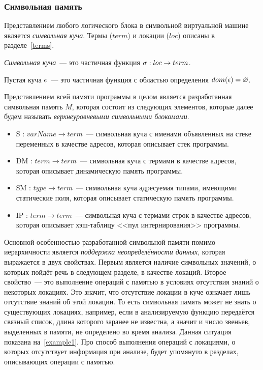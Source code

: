 \subsubsection{Символьная память}

Представлением любого логического блока в символьной виртуальной машине является \emph{символьная куча}. Термы ($term$) и локации ($loc$) описаны в разделе~\ref{terms}.
\begin{defn}
\emph{Символьная куча}~--- это частичная функция ${\sigma : loc \rightarrow term}$.
\end{defn}

\begin{defn}
Пустая куча $\epsilon$~--- это частичная функция с областью определения $dom(\epsilon)=\varnothing$.
\end{defn}

Представлением всей памяти программы в целом является разработанная символьная память $M$, которая состоит из следующих элементов, которые далее будем называть \emph{верхнеуровневыми символьными блокомами}.
\begin{itemize}
    \item S : $\mathit{varName} \rightarrow \mathit{term}$~--- символьная куча с именами объявленных на стеке переменных в качестве адресов, которая описывает стек программы.
    \item DM : $\mathit{term} \rightarrow \mathit{term}$~--- символьная куча с термами в качестве адресов, которая описывает динамическую память программы.
    \item SM : $\mathit{type} \rightarrow \mathit{term}$~--- символьная куча адресуемая типами, имеющими статические поля, которая описывает статическую память программы.
    \item IP : $\mathit{term} \rightarrow \mathit{term}$~--- символьная куча с термами строк в качестве адресов, которая описывает хэш-таблицу <<пул интернирования>> программы.
\end{itemize}

Основной особенностью разработанной символьной памяти помимо иерархичности является \emph{поддержка неопределённости данных}, которая выражается в двух свойствах. Первым является наличие символьных значений, о которых пойдёт речь в следующем разделе, в качестве локаций. Второе свойство~--- это выполнение операций с памятью в условиях отсутствия знаний о некоторых локациях. 
Это значит, что отсутствие локации в куче означает лишь отсутствие знаний об этой локации. 
То есть символьная память может не знать о существующих локациях, например, если в анализируемую функцию передаётся связный список, длина которого заранее не известна, а значит и число звеньев, выделенных в памяти, не определено во время анализа. Данная ситуация показана на~\autoref{example1}. Про способ выполнения операций с локациями, о которых отсутствует информация при анализе, будет упомянуто в разделах, описывающих операции с памятью.

